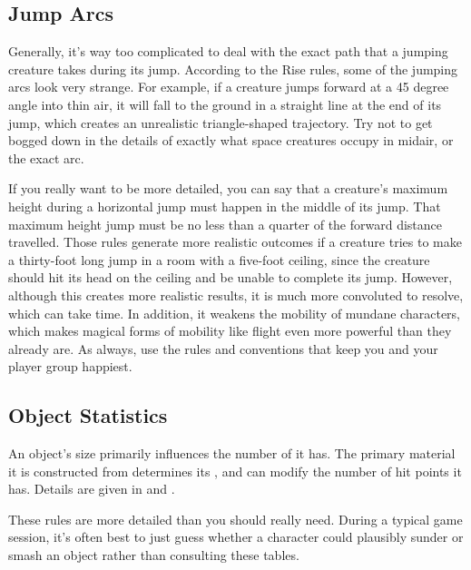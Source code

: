   \subsection{Jump Arcs}
    Generally, it's way too complicated to deal with the exact path that a jumping creature takes during its jump.
    According to the Rise rules, some of the jumping arcs look very strange.
    For example, if a creature jumps forward at a 45 degree angle into thin air, it will fall to the ground in a straight line at the end of its jump, which creates an unrealistic triangle-shaped trajectory.
    Try not to get bogged down in the details of exactly what space creatures occupy in midair, or the exact arc.

    If you really want to be more detailed, you can say that a creature's maximum height during a horizontal jump must happen in the middle of its jump.
    That maximum height jump must be no less than a quarter of the forward distance travelled.
    Those rules generate more realistic outcomes if a creature tries to make a thirty-foot long jump in a room with a five-foot ceiling, since the creature should hit its head on the ceiling and be unable to complete its jump.
    However, although this creates more realistic results, it is much more convoluted to resolve, which can take time.
    In addition, it weakens the mobility of mundane characters, which makes magical forms of mobility like flight even more powerful than they already are.
    As always, use the rules and conventions that keep you and your player group happiest.

  \subsection{Object Statistics}
    An object's size primarily influences the number of  it has.
    The primary material it is constructed from determines its , and can modify the number of hit points it has.
    Details are given in  and .

    These rules are more detailed than you should really need.
    During a typical game session, it's often best to just guess whether a character could plausibly sunder or smash an object rather than consulting these tables.

